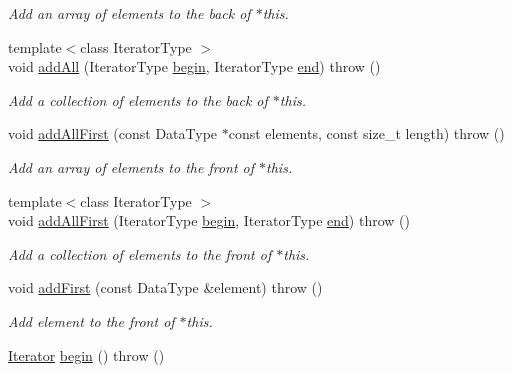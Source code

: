 \begin{DoxyCompactItemize}
\begin{DoxyCompactList}\small\item\em Add an array of elements to the back of {\ttfamily $\ast$this}. \end{DoxyCompactList}\item 
{\footnotesize template$<$class Iterator\-Type $>$ }\\void \hyperlink{classVectorDeque_a146d4e11742a18062ea3e9e8dd75769f}{add\-All} (Iterator\-Type \hyperlink{classVectorDeque_a2f16427750643789ac9bddc8337ec702}{begin}, Iterator\-Type \hyperlink{classVectorDeque_a3fe1250d2f55a3208ac1a2c8597ca4ed}{end})  throw ()
\begin{DoxyCompactList}\small\item\em Add a collection of elements to the back of {\ttfamily $\ast$this}. \end{DoxyCompactList}\item 
void \hyperlink{classVectorDeque_a97fd51c98bfeccbaf7b5fa24c3ca2f42}{add\-All\-First} (const Data\-Type $\ast$const elements, const size\-\_\-t length)  throw ()
\begin{DoxyCompactList}\small\item\em Add an array of elements to the front of {\ttfamily $\ast$this}. \end{DoxyCompactList}\item 
{\footnotesize template$<$class Iterator\-Type $>$ }\\void \hyperlink{classVectorDeque_afe87b9cd1769bb101cc024f8f7883502}{add\-All\-First} (Iterator\-Type \hyperlink{classVectorDeque_a2f16427750643789ac9bddc8337ec702}{begin}, Iterator\-Type \hyperlink{classVectorDeque_a3fe1250d2f55a3208ac1a2c8597ca4ed}{end})  throw ()
\begin{DoxyCompactList}\small\item\em Add a collection of elements to the front of {\ttfamily $\ast$this}. \end{DoxyCompactList}\item 
void \hyperlink{classVectorDeque_af28118e77d946e21445f460ca951d983}{add\-First} (const Data\-Type \&element)  throw ()
\begin{DoxyCompactList}\small\item\em Add {\ttfamily element} to the front of {\ttfamily $\ast$this}. \end{DoxyCompactList}\item 
\hyperlink{classVectorDeque_a14c9e8124611465c5aec6687b9c18a4b}{Iterator} \hyperlink{classVectorDeque_a2f16427750643789ac9bddc8337ec702}{begin} ()  throw ()

\end{DoxyCompactItemize}
